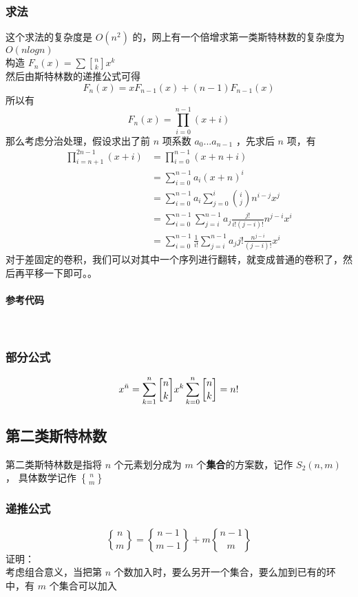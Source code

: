 	\subsubsection{求法}
	这个求法的复杂度是 $O(n^2)$ 的，网上有一个倍增求第一类斯特林数的复杂度为 $O(nlogn)$ \\
	构造 $F_n(x)=\sum {n\brack k}x^k$\\
	然后由斯特林数的递推公式可得
	$$
	F_n(x)=xF_{n-1}(x)+(n-1)F_{n-1}(x)
	$$
	所以有
	$$
	F_n(x)=\prod_{i=0}^{n-1}(x+i)
	$$
	那么考虑分治处理，假设求出了前 $n$ 项系数 $a_0...a_{n-1}$ ，先求后 $n$ 项，有
	$$
	\begin{aligned}
	\prod_{i=n+1}^{2n-1}(x+i)&=\prod_{i=0}^{n-1}(x+n+i)
	\\&=\sum_{i=0}^{n-1}a_i(x+n)^i
	\\&=\sum_{i=0}^{n-1}a_i\sum_{j=0}^{i}\binom{i}{j}n^{i-j}x^j
	\\&=\sum_{i=0}^{n-1}\sum_{j=i}^{n-1}a_j\frac{j!}{i!(j-i)!}n^{j-i}x^i
	\\&=\sum_{i=0}^{n-1}\frac{1}{i!}\sum_{j=i}^{n-1}a_jj!\frac{n^{j-i}}{(j-i)!}x^i
	\end{aligned}
	$$
	对于差固定的卷积，我们可以对其中一个序列进行翻转，就变成普通的卷积了，然后再平移一下即可。。\\
	\vspace{1cm}
	\paragraph{参考代码}~\\
	
	\vspace{1cm}
	\subsubsection{部分公式}
	
	$$
	x^{\bar{n}}=\sum_{k=1}^n{n\brack k}x^k\\
	\sum_{k=0}^n{n\brack k}=n!
	$$
	\newpage
	\subsection{第二类斯特林数}
	第二类斯特林数是指将 $n$ 个元素划分成为 $m$ 个\textbf{集合}的方案数，记作 $S_2(n,m)$ ， 具体数学记作 $n\brace m$ 
	\subsubsection{递推公式}
	$$
	{n\brace m}={n-1\brace m-1}+m{n-1\brace m}
	$$
	证明：\\
	考虑组合意义，当把第 $n$ 个数加入时，要么另开一个集合，要么加到已有的环中，有 $m$ 个集合可以加入
